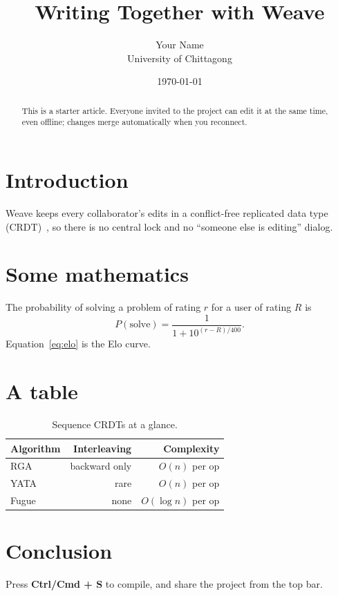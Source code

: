 \documentclass[11pt]{article}
\title{Writing Together with Weave}
\author{Your Name \\ \small University of Chittagong}
\date{\today}
\begin{document}
\maketitle

\begin{abstract}
This is a starter article. Everyone invited to the project can edit it at the same time,
even offline; changes merge automatically when you reconnect.
\end{abstract}

\section{Introduction}
Weave keeps every collaborator's edits in a conflict-free replicated data type
(CRDT)~\cite{shapiro2011crdt}, so there is no central lock and no ``someone else is editing''
dialog.

\section{Some mathematics}
The probability of solving a problem of rating $r$ for a user of rating $R$ is
\begin{equation}
  P(\text{solve}) = \frac{1}{1 + 10^{(r - R)/400}}.
  \label{eq:elo}
\end{equation}
Equation~\eqref{eq:elo} is the Elo curve.

\section{A table}
\begin{table}[h]
  \centering
  \begin{tabular}{lrr}
    \toprule
    Algorithm & Interleaving & Complexity \\
    \midrule
    RGA  & backward only & $O(n)$ per op \\
    YATA & rare          & $O(n)$ per op \\
    Fugue & none         & $O(\log n)$ per op \\
    \bottomrule
  \end{tabular}
  \caption{Sequence CRDTs at a glance.}
\end{table}

\section{Conclusion}
Press \textbf{Ctrl/Cmd + S} to compile, and share the project from the top bar.



\end{document}
